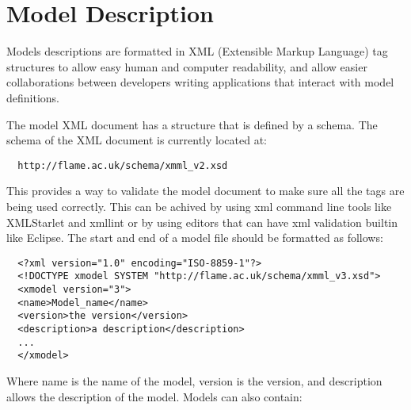 \section{Model Description}
\label{sec:model_description}

Models descriptions are formatted in XML (Extensible Markup Language) tag
structures to allow easy human and computer readability, and allow easier collaborations between
developers writing applications that interact with model definitions.

The model XML document has a structure that is defined by a schema.
The schema of the XML document is currently located
at:

\begin{verbatim}
  http://flame.ac.uk/schema/xmml_v2.xsd
\end{verbatim}

This provides a way to validate the model document to make sure all the tags are
being used correctly. This can be achived by using xml command line tools like
XMLStarlet and xmllint or by using editors that
can have xml validation builtin like Eclipse. The start and end
of a model file should be formatted as follows:

\begin{verbatim}
  <?xml version="1.0" encoding="ISO-8859-1"?>
  <!DOCTYPE xmodel SYSTEM "http://flame.ac.uk/schema/xmml_v3.xsd">
  <xmodel version="3">
  <name>Model_name</name>
  <version>the version</version>
  <description>a description</description>
  ...
  </xmodel>
\end{verbatim}

Where name is the name of the model, version is the version, and description
allows the description of the model. Models can also contain:

